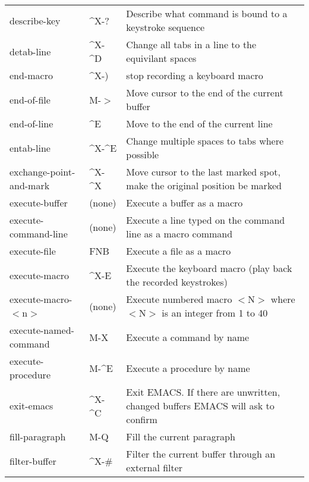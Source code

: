 \begin{tabular}{llp{287pt}}
describe-key &  \^{}X-? & Describe what command is bound to a
keystroke sequence\\

detab-line &  \^{}X-\^{}D & Change all tabs in a line to the
equivilant spaces\\

end-macro &  \^{}X-) & stop recording a keyboard macro\\

end-of-file &  M-$>${} & Move cursor to the end of the current buffer\\

end-of-line &  \^{}E & Move to the end of the current line\\

entab-line &  \^{}X-\^{}E & Change multiple spaces to tabs where
possible\\

exchange-point-and-mark & \^{}X-\^{}X & Move cursor to the last marked spot,
make the original position be marked\\

execute-buffer & (none) & Execute a buffer as a macro\\

execute-command-line & (none) & Execute a line typed on the command
line as a macro command\\

execute-file &  FNB & Execute a file as a macro\\

execute-macro &  \^{}X-E & Execute the keyboard macro (play back
the recorded keystrokes)\\

execute-macro-$<${}n$>${} & (none) & Execute numbered macro
$<${}N$>${} where $<${}N$>${} is an integer from 1 to 40\\

execute-named-command &  M-X & Execute a command by name\\

execute-procedure &  M-\^{}E & Execute a procedure by name\\

exit-emacs &  \^{}X-\^{}C & Exit EMACS. If there are unwritten,
changed buffers EMACS will ask to confirm\\

fill-paragraph &  M-Q & Fill the current paragraph\\

filter-buffer &  \^{}X-\# & Filter the current buffer through an
external filter\\


\end{tabular}
